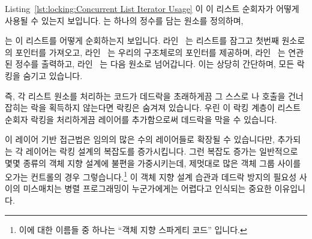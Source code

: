 \begin{fcvref}
Listing~\ref{lst:locking:Concurrent List Iterator Usage} 이 이 리스트 순회자가
어떻게 사용될 수 있는지 보입니다.
 는 하나의 정수를 담는  원소를 정의하며,
\end{fcvref}
\begin{fcvref}
 는 이 리스트를 어떻게 순회하는지 보입니다.
라인~ 는 리스트를 잠그고 첫번째 원소로의 포인터를 가져오고,
라인~ 는 우리의  구조체로의 포인터를 제공하며,
라인~ 는 연관된 정수를 출력하고,
라인~ 는 다음 원소로 넘어갑니다.
이는 상당히 간단하며, 모든 락킹을 숨기고 있습니다.
\end{fcvref}

즉, 각 리스트 원소를 처리하는 코드가 데드락을 초래하게끔 그 스스로
 나  호출을 건너 잡히는 락을 획득하지 않는다면
락킹은 숨겨져 있습니다.
우린 이 락킹 계층이 리스트 순회자 락킹을 처리하게끔 레이어를 추가함으로써
데드락을 막을 수 있습니다.

이 레이어 기반 접근법은 임의의 많은 수의 레이어들로 확장될 수 있습니다만,
추가되는 각 레이어는 락킹 설계의 복잡도를 증가시킵니다.
그런 복잡도 증가는 일반적으로 몇몇 종류의 객체 지향 설계에 불편을 가중시키는데,
제멋대로 많은 객체 그룹 사이를 오가는 컨트롤의 경우 그렇습니다.\footnote{
	이에 대한 이름들 중 하나는 ``객체 지향 스파게티 코드'' 입니다.}
이 객체 지향 설계 습관과 데드락 방지의 필요성 사이의 미스매치는 병렬
프로그래밍이 누군가에게는 어렵다고 인식되는 중요한 이유입니다.

